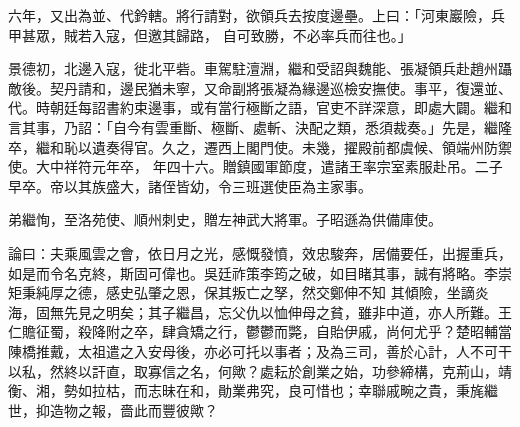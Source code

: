 \begin{pinyinscope}
 六年，又出為並、代鈐轄。將行請對，欲領兵去按度邊壘。上曰：「河東巖險，兵甲甚眾，賊若入寇，但邀其歸路，
 自可致勝，不必率兵而往也。」



 景德初，北邊入寇，徙北平砦。車駕駐澶淵，繼和受詔與魏能、張凝領兵赴趙州躡敵後。契丹請和，邊民猶未寧，又命副將張凝為緣邊巡檢安撫使。事平，復還並、代。時朝廷每詔書約束邊事，或有當行極斷之語，官吏不詳深意，即處大闢。繼和言其事，乃詔：「自今有雲重斷、極斷、處斬、決配之類，悉須裁奏。」先是，繼隆卒，繼和恥以遺奏得官。久之，遷西上閣門使。未幾，擢殿前都虞候、領端州防禦使。大中祥符元年卒，
 年四十六。贈鎮國軍節度，遣諸王率宗室素服赴吊。二子早卒。帝以其族盛大，諸侄皆幼，令三班選使臣為主家事。



 弟繼恂，至洛苑使、順州刺史，贈左神武大將軍。子昭遜為供備庫使。



 論曰：夫乘風雲之會，依日月之光，感慨發憤，效忠駿奔，居備要任，出握重兵，如是而令名克終，斯固可偉也。吳廷祚策李筠之破，如目睹其事，誠有將略。李崇矩秉純厚之德，感史弘肇之恩，保其叛亡之孥，然交鄭伸不知
 其傾險，坐謫炎海，固無先見之明矣；其子繼昌，忘父仇以恤伸母之貧，雖非中道，亦人所難。王仁贍征蜀，殺降附之卒，肆貪矯之行，鬱鬱而斃，自貽伊戚，尚何尤乎？楚昭輔當陳橋推戴，太祖遣之入安母後，亦必可托以事者；及為三司，善於心計，人不可干以私，然終以訐直，取寡信之名，何歟？處耘於創業之始，功參締構，克荊山，靖衡、湘，勢如拉枯，而志昧在和，勛業弗究，良可惜也；幸聯戚畹之貴，秉旄繼世，抑造物之報，嗇此而豐彼歟？



\end{pinyinscope}